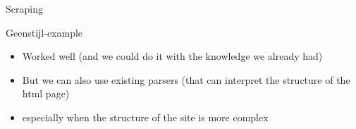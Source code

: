 \documentclass{beamer}
\begin{document}
\begin{frame}{Scraping}
\begin{block}{Geenstijl-example}
\begin{itemize}
\item<1->Worked well (and we could do it with the knowledge we already had)
\item<2->But we can also use existing parsers (that can interpret the structure of the html page)
\item<3->especially when the structure of the site is more complex 
\end{itemize}
\end{block}
\end{frame}

{
	\begin{frame}[plain]
\end{frame}
}

{
	\begin{frame}[plain]
\end{frame}
}
\end{document}
